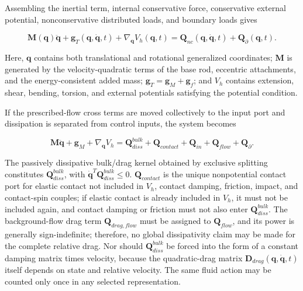 Assembling the inertial term, internal conservative force, conservative external potential, nonconservative distributed loads, and boundary loads gives

\begin{equation}
\label{eq:galerkin-2-97}
\boxed{\mathbf{M}\left( \mathbf{q} \right)\ddot{\mathbf{q}} + \mathbf{g}_{T}\left( \mathbf{q},\dot{\mathbf{q}},t \right) + \nabla_{\mathbf{q}}V_{h}\left( \mathbf{q},t \right) = \mathbf{Q}_{nc}\left( \mathbf{q},\dot{\mathbf{q}},t \right) + \mathbf{Q}_{\partial}\left( \mathbf{q},t \right).}
\end{equation}

Here, \(\mathbf{q}\) contains both translational and rotational generalized coordinates; \(\mathbf{M}\) is generated by the velocity-quadratic terms of the base rod, eccentric attachments, and the energy-consistent added mass; \(\mathbf{g}_{T} = \mathbf{g}_{M} + \mathbf{g}_{f}\); and \(V_{h}\) contains extension, shear, bending, torsion, and external potentials satisfying the potential condition.

If the prescribed-flow cross terms are moved collectively to the input port and dissipation is separated from control inputs, the system becomes

\begin{equation}
\label{eq:galerkin-2-98}
\mathbf{M}\ddot{\mathbf{q}} + \mathbf{g}_{M} + \nabla_{\mathbf{q}}V_{h} = \mathbf{Q}_{diss}^{bulk} + \mathbf{Q}_{contact} + \mathbf{Q}_{in} + \mathbf{Q}_{flow} + \mathbf{Q}_{\partial}.
\end{equation}

The passively dissipative bulk/drag kernel obtained by exclusive splitting constitutes \(\mathbf{Q}_{diss}^{bulk}\), with \({\dot{\mathbf{q}}}^{T}\mathbf{Q}_{diss}^{bulk} \leq 0\). \(\mathbf{Q}_{contact}\) is the unique nonpotential contact port for elastic contact not included in \(V_h\), contact damping, friction, impact, and contact-spin couples; if elastic contact is already included in \(V_h\), it must not be included again, and contact damping or friction must not also enter \(\mathbf{Q}_{diss}^{bulk}\). The background-flow drag term \(\mathbf{Q}_{drag,flow}\) must be assigned to \(\mathbf{Q}_{flow}\), and its power is generally sign-indefinite; therefore, no global dissipativity claim may be made for the complete relative drag. Nor should \(\mathbf{Q}_{diss}^{bulk}\) be forced into the form of a constant damping matrix times velocity, because the quadratic-drag matrix \(\mathbf{D}_{drag}\left( \mathbf{q},\dot{\mathbf{q}},t \right)\) itself depends on state and relative velocity. The same fluid action may be counted only once in any selected representation.

